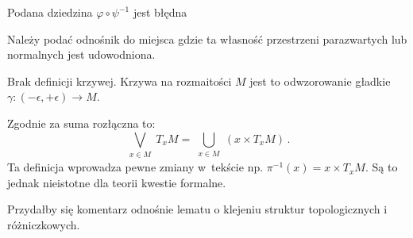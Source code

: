 \documentclass[a4paper,11pt]{article}
\begin{document}
\vspace{\spaceFour}


\start {} Podana dziedzina $\varphi \circ \psi^{ -1 }$ jest błędna

\vspace{\spaceFour}


\start {} Należy podać odnośnik do miejsca gdzie ta własność
przestrzeni parazwartych lub normalnych jest udowodniona.

\vspace{\spaceFour}


\start {} Brak definicji krzywej. Krzywa na rozmaitości $M$ jest
to odwzorowanie gładkie $\gamma : ( - \epsilon, + \epsilon ) \to M$.

\vspace{\spaceFour}


\start {} Zgodnie za \cite{ESTA} suma rozłączna to:
\begin{equation}
  \label{eq:}
  \bigvee_{ \substack{ x \in M } } T_{ x } M
  = \bigcup_{ \substack{ x \in M } }( x \times T_{ x } M ) \, .
\end{equation}
Ta definicja wprowadza pewne zmiany w~tekście np.
$\pi^{ -1 }( x ) = x \times T_{ x }M$. Są to jednak nieistotne dla
teorii kwestie formalne.

\vspace{\spaceFour}


\start {} Przydałby się komentarz odnośnie lematu o klejeniu
struktur topologicznych i różniczkowych.
\end{document}
